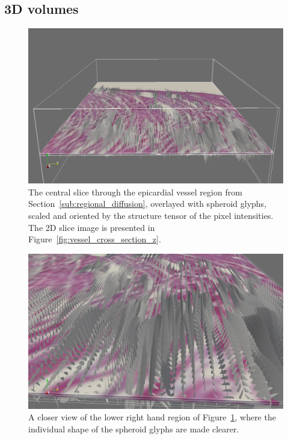   \subsection{3D volumes} %
  \label{sub:3d_volumes}
    \begin{figure}
      \centering
      \includegraphics[width=\textwidth]{Ch7/Figs/structure_tensor_glyphs}
      \caption{The central slice through the epicardial vessel region from Section~\ref{sub:regional_diffusion}, overlayed with spheroid glyphs, scaled and oriented by the structure tensor of the pixel intensities. The 2D slice image is presented in Figure~\ref{fig:vessel_cross_section_z}.}
      \label{fig:structure_tensor_glyphs}
    \end{figure}
    
    \begin{figure}
      \centering
      \includegraphics[width=\textwidth]{Ch7/Figs/structure_tensor_glyphs_zoom}
      \caption{A closer view of the lower right hand region of Figure~\ref{fig:structure_tensor_glyphs}, where the individual shape of the spheroid glyphs are made clearer.}
      \label{fig:structure_tensor_glyphs_zoom}
    \end{figure}
    
